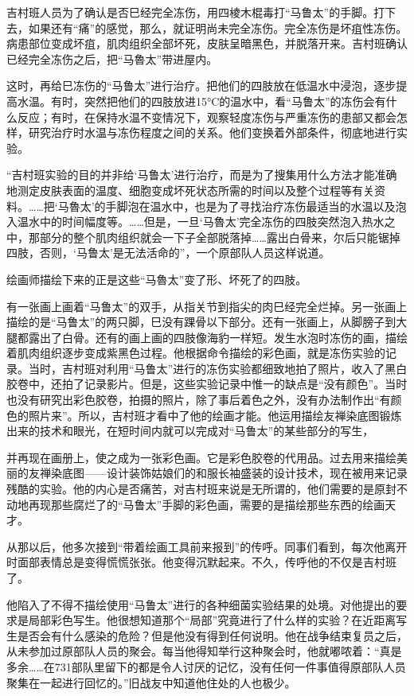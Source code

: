 \documentclass[a4paper,12pt,UTF8,twoside]{ctexbook}
\begin{document}
吉村班人员为了确认是否巳经完全冻伤，用四棱木棍毒打“马鲁太”的手脚。打下去，如果还有“痛”的感觉，那么，就证明尚未完全冻伤。完全冻伤是坏疽性冻伤。病患部位变成坏疽，肌肉组织全部坏死，皮肤呈暗黑色，并脱落开来。吉村班确认已经完全冻伤之后，把“马魯太”带进屋内。

这时，再给巳冻伤的“马鲁太”进行治疗。把他们的四肢放在低温水中浸泡，逐步提高水温。有时，突然把他们的四肢放进15°C的温水中，看“马鲁太”的冻伤会有什么反应；有时，在保持水温不变情况下，观察轻度冻伤与严重冻伤的患部又都会怎样，研究治疗时水温与冻伤程度之间的关系。他们变换着外部条件，彻底地进行实验。

“吉村班实验的目的并非给‘马鲁太’进行治疗，而是为了搜集用什么方法才能准确地测定皮肤表面的温度、细胞变成坏死状态所需的时间以及整个过程等有关资料。……把‘马魯太’的手脚泡在温水中，也是为了寻找治疗冻伤最适当的水温以及泡入温水中的时间幅度等。……但是，一旦‘马魯太’完全冻伤的四肢突然泡入热水之中，那部分的整个肌肉组织就会一下子全部脱落掉……露出白骨来，尔后只能锯掉四肢，否则，‘马鲁太’是无法活命的”，一个原部队人员这样说道。

绘画师描绘下来的正是这些“马魯太”变了形、坏死了的四肢。

有一张画上画着“马鲁太”的双手，从指关节到指尖的肉巳经完全烂掉。另一张画上描绘的是“马鲁太”的两只脚，巳没有踝骨以下部分。还有一张画上，从脚膀子到大腿都露出了白骨。还有的画上画的四肢像海豹一样短。发生水泡时冻伤的画，描绘着肌肉组织逐步变成紫黑色过程。他根据命令描绘的彩色画，就是冻伤实验的记录。当时，吉村班对利用“马鲁太”进行的冻伤实验都细致地拍了照片，收入了黑白胶卷中，还拍了记录影片。但是，这些实验记录中惟一的缺点是“没有颜色”。当时也没有研究出彩色胶卷，拍摄的照片，除了事后着色之外，没有办法制作出“有颜色的照片来”。所以，吉村班才看中了他的绘画才能。他运用描绘友禅染底图锻炼出来的技术和眼光，在短时间内就可以完成对“马鲁太”的某些部分的写生，

并再现在画册上，使之成为一张彩色画。它是彩色胶卷的代用品。过去用来描绘美丽的友禅染底图——设计装饰姑娘们的和服长袖盛装的设计技术，现在被用来记录残酷的实验。他的内心是否痛苦，对吉村班来说是无所谓的，他们需要的是原封不动地再现那些腐烂了的“马鲁太”手脚的彩色画，需要的是描绘那些东西的绘画天才。

从那以后，他多次接到“带着绘画工具前来报到”的传呼。同事们看到，每次他离开时面部表情总是变得慌慌张张。他变得沉默起来。不久，传呼他的不仅是吉村班了。

他陷入了不得不描绘使用“马鲁太”进行的各种细菌实验结果的处境。对他提出的要求是局部彩色写生。他很想知道那个“局部”究竟进行了什么样的实验？在近距离写生是否会有什么感染的危险？但是他没有得到任何说明。他在战争结束复员之后，从未参加过原部队人员的聚会。每当他得知举行这种聚会时，他就嘟哝着：“真是多余……在731部队里留下的都是令人讨厌的记忆，没有任何一件事值得原部队人员聚集在一起进行回忆的。”旧战友中知道他住处的人也极少。
\end{document}
